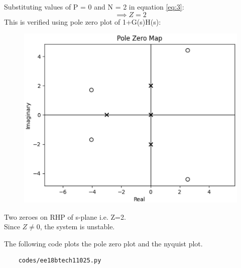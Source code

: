 \begin{enumerate}[label=\thesubsection.\arabic*.,ref=\thesubsection.\theenumi]
Substituting values of P = 0 and N = 2 in equation \ref{eq:3}:
\begin{equation}
 \implies Z = 2
\end{equation}
This is verified using pole zero plot of 1+G(s)H(s): \\
\begin{figure}[ht!]
    \includegraphics[width=\columnwidth]{./figs/ee18btech11025/pzG1.eps}
    \caption{}
    \label{fig:pz1}
\end{figure}
Two zeroes on RHP of s-plane i.e. Z=2. \\
Since $Z\neq0$, the system is unstable.

The following code plots the pole zero plot and the nyquist plot.
\begin{lstlisting}
    codes/ee18btech11025.py
\end{lstlisting}
\end{enumerate}